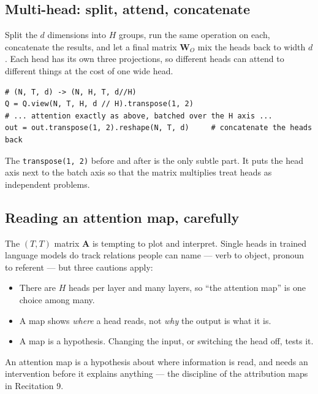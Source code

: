 \documentclass[11pt]{article}
\begin{document}
\subsection{Multi-head: split, attend, concatenate}

Split the $d$ dimensions into $H$ groups, run the same operation on each,
concatenate the results, and let a final matrix $\boldsymbol{W}_O$ mix the heads
back to width $d$. Each head has its own three projections, so different heads
can attend to different things at the cost of one wide head.

\begin{lstlisting}
# (N, T, d) -> (N, H, T, d//H)
Q = Q.view(N, T, H, d // H).transpose(1, 2)
# ... attention exactly as above, batched over the H axis ...
out = out.transpose(1, 2).reshape(N, T, d)     # concatenate the heads back
\end{lstlisting}

The \texttt{transpose(1, 2)} before and after is the only subtle part. It puts
the head axis next to the batch axis so that the matrix multiplies treat heads
as independent problems.

\subsection{Reading an attention map, carefully}

The $(T, T)$ matrix $\boldsymbol{A}$ is tempting to plot and interpret. Single
heads in trained language models do track relations people can name --- verb to
object, pronoun to referent --- but three cautions apply:

\begin{itemize}
  \item There are $H$ heads per layer and many layers, so ``the attention map''
        is one choice among many.
  \item A map shows \emph{where} a head reads, not \emph{why} the output is what
        it is.
  \item A map is a hypothesis. Changing the input, or switching the head off,
        tests it.
\end{itemize}

\begin{keybox}
 An attention map is a hypothesis about where
information is read, and needs an intervention before it explains anything ---
the discipline of the attribution maps in Recitation 9.
\end{keybox}
\end{document}
